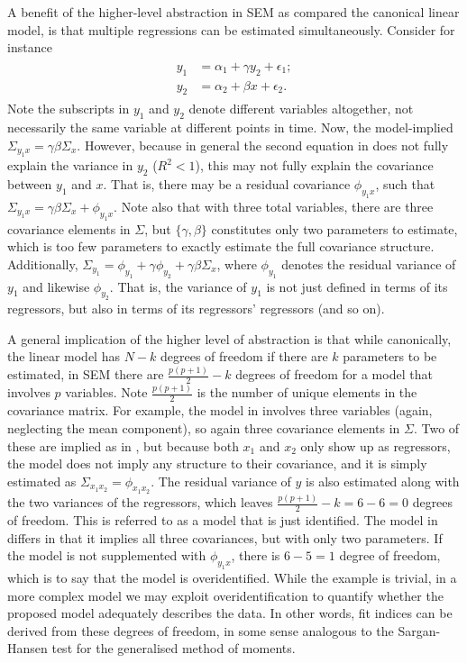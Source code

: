 A benefit of the higher-level abstraction in SEM as compared the canonical linear model, is that multiple regressions
can be estimated simultaneously. Consider for instance
\begin{align}
\begin{split}
    \label{eq:methods:simultaneous_regression}
    y_1 &= \alpha_1 + \gamma y_2 + \epsilon_1;\\
    y_2 &= \alpha_2 + \beta x + \epsilon_2.
\end{split}
\end{align}
Note the subscripts in $y_1$ and $y_2$ denote different variables altogether,
not necessarily the same variable at different points in time.
Now, the model-implied $\Sigma_{y_1 x} = \gamma \beta \Sigma_x$.
However, because in general the second equation in  does not fully explain the
variance in $y_2$ ($R^2 < 1$), this may not fully explain the covariance between $y_1$ and $x$.
That is, there may be a residual covariance $\phi_{y_1 x}$, such that $\Sigma_{y_1 x} = \gamma \beta \Sigma_x + \phi_{y_1 x}$.
Note also that with three total variables, there are three covariance elements in $\Sigma$, but $\{\gamma, \beta\}$
constitutes only two parameters to estimate, which is too few parameters to exactly estimate the full covariance structure.
Additionally, $\Sigma_{y_1} = \phi_{y_1} + \gamma \phi_{y_2} + \gamma \beta \Sigma_x$, where
$\phi_{y_1}$ denotes the residual variance of $y_1$ and likewise $\phi_{y_2}$. That is, the variance of $y_1$ is not
just defined in terms of its regressors, but also in terms of its regressors' regressors (and so on).

A general implication of the higher level of abstraction is that while canonically, the linear model has $N - k$ degrees
of freedom if there are $k$ parameters to be estimated, in SEM there are $\frac{p(p+1)}{2} - k$ degrees of freedom
for a model that involves $p$ variables. Note $\frac{p(p+1)}{2}$ is the number of unique elements in the covariance matrix.
For example, the model in  involves three variables (again, neglecting the mean component),
so again three covariance elements in $\Sigma$. Two of these are implied as in ,
but because both $x_1$ and $x_2$ only show up as regressors, the model does not imply any structure to their covariance,
and it is simply estimated as $\Sigma_{x_1 x_2} = \phi_{x_1 x_2}$. The residual variance of $y$ is also estimated along
with the two variances of the regressors, which leaves $\frac{p(p + 1)}{2} - k = 6 - 6 = 0$ degrees of freedom. This is
referred to as a model that is just identified.
The model in  differs in that it implies all three covariances, but with only two
parameters. If the model is not supplemented with $\phi_{y_1 x}$, there is $6 - 5 = 1$ degree of freedom, which is to
say that the model is overidentified.
While the example is trivial, in a more complex model we may exploit overidentification to quantify
whether the proposed model adequately describes the data. In other words, fit indices can be derived from these degrees
of freedom, in some sense analogous to the Sargan-Hansen test for the generalised method of moments.

